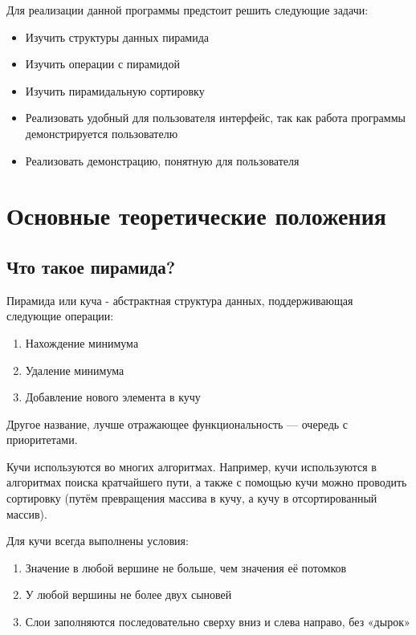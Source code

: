 \documentclass{article}
\begin{document}
Для реализации данной программы предстоит решить следующие задачи:

\begin{itemize}
    \item Изучить структуры данных пирамида
    \item Изучить операции с пирамидой
    \item Изучить пирамидальную сортировку
    \item Реализовать удобный для пользователя интерфейс, так как работа программы демонстрируется пользователю
    \item Реализовать демонстрацию, понятную для пользователя
\end{itemize}

\newpage

\section{Основные теоретические положения}

\subsection{Что такое пирамида?}

Пирамида или куча - абстрактная структура данных, поддерживающая следующие операции:

\begin{enumerate}
    \item Нахождение минимума
    \item Удаление минимума
    \item Добавление нового элемента в кучу
\end{enumerate}

Другое название, лучше отражающее функциональность — очередь с приоритетами.

Кучи используются во многих алгоритмах. Например, кучи используются в алгоритмах поиска кратчайшего пути, а также с помощью кучи можно проводить сортировку (путём превращения массива в кучу, а кучу в отсортированный массив).

Для кучи всегда выполнены условия:

\begin{enumerate}
    \item Значение в любой вершине не больше, чем значения её потомков
    \item У любой вершины не более двух сыновей
    \item Слои заполняются последовательно сверху вниз и слева направо, без «дырок»
\end{enumerate}
\end{document}
